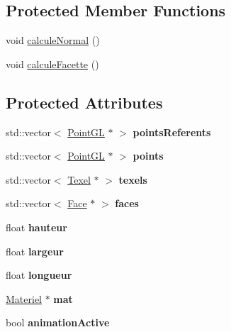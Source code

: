 \subsection*{Protected Member Functions}
\begin{DoxyCompactItemize}
\item 
void \hyperlink{classObjet3D_a55b19161ab383c859dda77a43f7471fc}{calcule\-Normal} ()
\item 
void \hyperlink{classObjet3D_af4fb214001539392efb76b79a047c93e}{calcule\-Facette} ()
\end{DoxyCompactItemize}
\subsection*{Protected Attributes}
\begin{DoxyCompactItemize}
\item 
\hypertarget{classObjet3D_a69365378a5fae36f1e9f2fc7722fc4f5}{std\-::vector$<$ \hyperlink{classPointGL}{Point\-G\-L} $\ast$ $>$ {\bfseries points\-Referents}}\label{classObjet3D_a69365378a5fae36f1e9f2fc7722fc4f5}

\item 
\hypertarget{classObjet3D_a4ea8b7db42b1ba185f55ce49d3cdd13e}{std\-::vector$<$ \hyperlink{classPointGL}{Point\-G\-L} $\ast$ $>$ {\bfseries points}}\label{classObjet3D_a4ea8b7db42b1ba185f55ce49d3cdd13e}

\item 
\hypertarget{classObjet3D_a96937966af7a998d477ff60499f88e89}{std\-::vector$<$ \hyperlink{classTexel}{Texel} $\ast$ $>$ {\bfseries texels}}\label{classObjet3D_a96937966af7a998d477ff60499f88e89}

\item 
\hypertarget{classObjet3D_a910312e0c543bc5c1f423f713a841e9e}{std\-::vector$<$ \hyperlink{classFace}{Face} $\ast$ $>$ {\bfseries faces}}\label{classObjet3D_a910312e0c543bc5c1f423f713a841e9e}

\item 
\hypertarget{classObjet3D_afd0238a66814cdbf2fca0fc6afe89ff2}{float {\bfseries hauteur}}\label{classObjet3D_afd0238a66814cdbf2fca0fc6afe89ff2}

\item 
\hypertarget{classObjet3D_afcc95dcb6e9e0f85af4633bde1992da6}{float {\bfseries largeur}}\label{classObjet3D_afcc95dcb6e9e0f85af4633bde1992da6}

\item 
\hypertarget{classObjet3D_a02b4e577a1f81f5df155e5e94de71252}{float {\bfseries longueur}}\label{classObjet3D_a02b4e577a1f81f5df155e5e94de71252}

\item 
\hypertarget{classObjet3D_a7fb70f76d88b1dfbd32eb2d888bd321d}{\hyperlink{classMateriel}{Materiel} $\ast$ {\bfseries mat}}\label{classObjet3D_a7fb70f76d88b1dfbd32eb2d888bd321d}

\item 
\hypertarget{classObjet3D_a3a3b7dc321d2aed3e729595e6ec9cd85}{bool {\bfseries animation\-Active}}\label{classObjet3D_a3a3b7dc321d2aed3e729595e6ec9cd85}

\end{DoxyCompactItemize}


